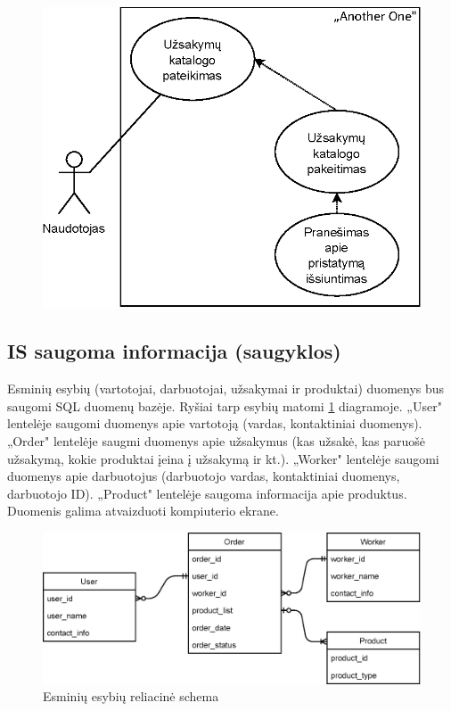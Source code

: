 \documentclass{VUMIFPSkursinis}
\begin{document}
\begin{figure}[H]
    \centering
    \includegraphics[scale=1]{img/ProductUseCase5}
\end{figure}

\newpage
\subsection{IS saugoma informacija (saugyklos)}
Esminių esybių (vartotojai, darbuotojai, užsakymai ir produktai) duomenys bus saugomi SQL duomenų bazėje. Ryšiai tarp esybių matomi \ref{img:RS} diagramoje. „User" lentelėje saugomi duomenys apie vartotoją (vardas, kontaktiniai duomenys). „Order" lentelėje saugmi duomenys apie užsakymus (kas užsakė, kas paruošė užsakymą, kokie produktai įeina į užsakymą ir kt.). „Worker" lentelėje saugomi duomenys apie darbuotojus (darbuotojo vardas, kontaktiniai duomenys, darbuotojo ID). „Product" lentelėje saugoma informacija apie produktus. \\
Duomenis galima atvaizduoti kompiuterio ekrane.
\begin{figure}[H]
    \centering
    \includegraphics[scale=1]{img/RealiacineSchema}
    \caption{Esminių esybių reliacinė schema}
    \label{img:RS}
\end{figure}
\end{document}
